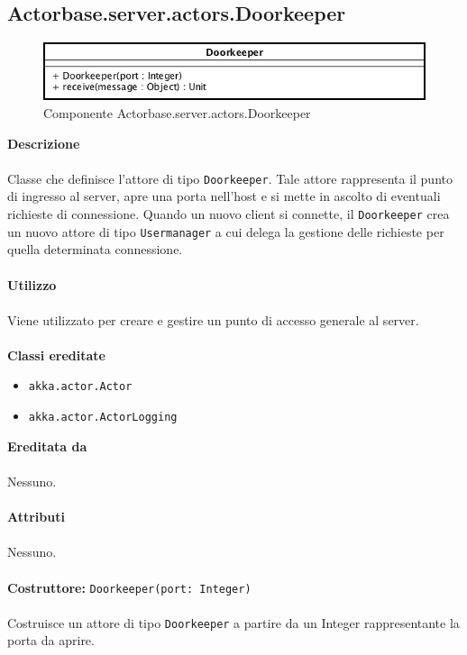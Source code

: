 \documentclass[a4paper]{article}
\begin{document}
	\subsection{Actorbase.server.actors.Doorkeeper}
		\begin{figure}[H]
			\centering
			\includegraphics[width=\textwidth]{Server/doorkeeper.jpg}
			\caption{Componente Actorbase.server.actors.Doorkeeper}
		\end{figure}
		\textbf{Descrizione}
			\\ \\
			Classe che definisce l'attore di tipo \texttt{Doorkeeper}. Tale attore rappresenta il punto di ingresso al server, apre una porta nell'host e si mette in ascolto di eventuali richieste di connessione. Quando un nuovo client si connette, il \texttt{Doorkeeper} crea un nuovo attore di tipo \texttt{Usermanager} a cui delega la gestione delle richieste per quella determinata connessione.
			\\ \\
		\textbf{Utilizzo}
			\\ \\
			Viene utilizzato per creare e gestire un punto di accesso generale al server.
			\\ \\
		\textbf{Classi ereditate}
			\begin{itemize}
				\item \texttt{akka.actor.Actor}
				\item \texttt{akka.actor.ActorLogging}
			\end{itemize}
		\textbf{Ereditata da}
			\\ \\
			Nessuno.
			\\ \\
		\textbf{Attributi}
			\\ \\
			Nessuno.
			\\ \\
		\textbf{Costruttore: }\texttt{Doorkeeper(port: Integer)}
			\\ \\
			Costruisce un attore di tipo \texttt{Doorkeeper} a partire da un Integer rappresentante la porta da aprire.
			\\ \\
\end{document}
